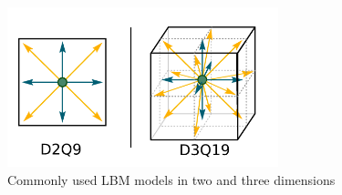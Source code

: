 \documentclass[12pt, notitlepage]{article}
\begin{document}
\begin{figure}[h!]
	\begin{center}
		\includegraphics[width=0.7\textwidth]{dimension_model}
		\caption{Commonly used LBM models in two and three dimensions}
		\label{dimension_model}
	\end{center}
\end{figure}
\end{document}
